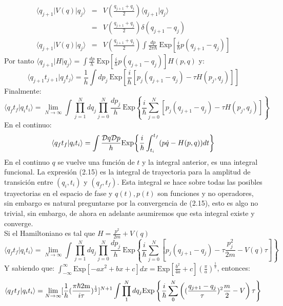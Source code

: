 \begin{eqnarray}
\nonumber \langle q_{j+1}|V(q)|q_j \rangle &=& V(\frac{q_{j+1}+q_j}{2})\langle q_{j+1}|q_j\rangle\\
\nonumber &=& V(\frac{q_{j+1}+q_j}{2})\delta(q_{j+1}-q_j)\\
\langle q_{j+1}|V(q)|q_j \rangle &=& V(\frac{q_{j+1}+q_j}{2})\int \frac{dp}{2\pi\hbar}\ \text{Exp}[\frac{i}{\hbar}p(q_{j+1}-q_j)]
\end{eqnarray}
Por tanto $\langle q_{j+1}|H|q_j\rangle=\int \frac{dp}{h}\ \text{Exp}[\frac{i}{h}p(q_{j+1}-q_j)]H(p,q)$ y:
\begin{equation}
\langle q_{j+1}t_{j+1}|q_jt_j\rangle=\frac{1}{h}\int dp_j\ \text{Exp}[\frac{i}{\hbar}[p_j(q_{j+1}-q_j)-\tau H(p_j,q_j)]]
\end{equation}
Finalmente:
\begin{equation}
\langle q_{f}t_{f}|q_it_i\rangle=\lim_{N \to \infty}\int\prod_{j=1}^{N}dq_j\prod_{j=0}^{N}\frac{dp_j}{h}\ \text{Exp}\left\{ \frac{i}{\hbar}\sum_{j=0}^{N}[p_{j}(q_{j+1}-q_{j})-\tau H(p_{j},q_{j})]\right\}
\end{equation}
En el continuo:
\begin{equation}
\langle q_{f}t_{f}|q_it_i\rangle=\int\frac{\mathcal{D}q\mathcal{D}p}{h}\text{Exp\ensuremath{\left\{ \frac{i}{\hbar}\int_{t_{i}}^{t_{f}}(p\dot{q}-H(p,q))dt\right\} }}
\end{equation}
En el continuo $q$ se vuelve una función de $t$ y la integral anterior, es una integral funcional. La expresión (2.15) es la integral de trayectoria para la amplitud de transición entre $(q_i,t_i)$ y $(q_f,t_f)$. Esta integral se hace sobre todas las posibles trayectorias en el espacio de fase y $q(t), p(t)$ son funciones y no operadores, sin embargo es natural preguntarse por la convergencia de (2.15), esto es algo no trivial, sin embargo, de ahora en adelante asumiremos que esta integral existe y converge. 	
\\
Si el Hamiltoniano es tal que $H=\frac{p^2}{2m}+V(q)$
\begin{equation}
\langle q_{f}t_{f}|q_it_i\rangle=\lim_{N \to \infty}\int\prod_{j=1}^{N}dq_j\prod_{j=0}^{N}\frac{dp_j}{h}\ \text{Exp}\left\{ \frac{i}{\hbar}\sum_{j=0}^{N}[p_{j}(q_{j+1}-q_{j})-\tau \frac{p_j^2}{2m}-V(q)\tau]\right\}
\end{equation}
Y sabiendo que: $\int_{-\infty}^{\infty}\text{Exp}[-ax^{2}+bx+c]dx=\text{Exp}[\frac{b^{2}}{4a}+c](\frac{\pi}{a})^{\frac{1}{2}}$, entonces:
\begin{equation}
\langle q_{f}t_{f}|q_it_i\rangle=\lim_{N\to\infty}[\frac{1}{h}(\frac{\text{\ensuremath{\pi\hbar}2m}}{i\tau})^{\frac{1}{2}}]^{N+1}\int\prod_{1}^{N}dq_{j}\text{Exp}\left\{ \frac{i}{\hbar}\sum_{0}^{N}\left((\frac{q_{j+1}-q_{j}}{\tau})^{2}\frac{m}{2}-V\right)\tau\right\} 
\end{equation}
